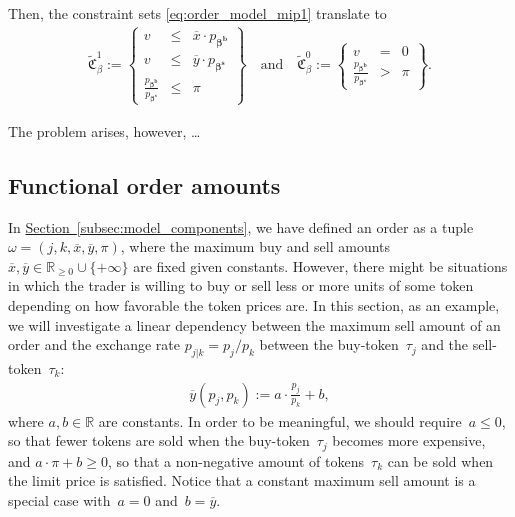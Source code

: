 \documentclass[11pt,parskip=full]{scrartcl}%
\newcommand*{\secref}[1]{\hyperref[{#1}]{Section~\ref*{#1}}}
\begin{document}
Then, the constraint sets \eqref{eq:order_model_mip1} translate to
\begin{align}
  \tilde{\mathfrak{C}}^1_\beta := \left\{
  \begin{array}{rlll}
    v &\le & \overline{x} \cdot p_{\bm{\beta^b}} \\
    v &\le & \overline{y} \cdot p_{\bm{\beta^s}} \\[1mm]
    \frac{p_{\bm{\beta^b}}}{p_{\bm{\beta^s}}} &\le & \pi
  \end{array}
  \right\}
  \quad
  \text{and}
  \quad
  \tilde{\mathfrak{C}}^0_\beta := \left\{
  \begin{array}{rll}
    v &= & 0 \\[1mm]
    \frac{p_{\bm{\beta^b}}}{p_{\bm{\beta^s}}} &> & \pi
  \end{array}
  \right\}.
  \label{eq:basket_order_model_mip1}
\end{align}

The problem arises, however, \ldots


\newpage
\subsection{Functional order amounts}

In \secref{subsec:model_components}, we have defined an order as a tuple~
$\omega = (j,k,\overline{x},\overline{y},\pi)$,
where the maximum buy and sell amounts~
$\overline{x}, \overline{y} \in \mathbb{R}_{\ge 0} \cup \{+\infty\}$
are fixed given constants.
However, there might be situations in which the trader is willing to buy or sell less or more units
of some token depending on how favorable the token prices are.
In this section, as an example, we will investigate a linear dependency between the maximum sell
amount of an order and the exchange rate $p_{j|k} = p_j/p_k$ between the buy-token~$\tau_j$ and the
sell-token~$\tau_k$: 
\begin{align}
  \overline{y}(p_j, p_k) := a \cdot \frac{p_j}{p_k} + b,
\end{align}
where $a, b \in \mathbb{R}$ are constants.
In order to be meaningful, we should require~$a \le 0$, so that fewer tokens are sold when the
buy-token~$\tau_j$ becomes more expensive, and $a \cdot \pi + b \ge 0$, so that a non-negative
amount of tokens~$\tau_k$ can be sold when the limit price is satisfied.
Notice that a constant maximum sell amount is a special case with~$a = 0$ and~$b = \overline{y}$.
\end{document}
